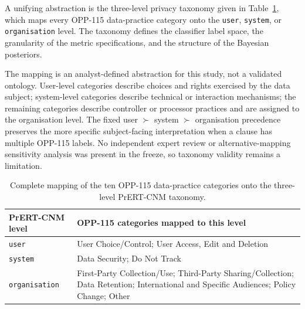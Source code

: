 \documentclass[final,3p,times,twocolumn]{elsarticle}
\begin{document}
	A unifying abstraction is the three-level privacy taxonomy given in Table~\ref{tab:labelspace},
	which maps every OPP-115 data-practice category onto the \texttt{user},
	\texttt{system}, or \texttt{organisation} level. The taxonomy defines the
	classifier label space, the granularity of the metric specifications, and the
	structure of the Bayesian posteriors.

	\begin{table}[!h]
		\centering
		\caption{Complete mapping of the ten OPP-115 data-practice categories onto
		the three-level PrERT-CNM taxonomy.}
		\label{tab:labelspace}
		The mapping is an analyst-defined abstraction for this study, not a
		validated ontology. User-level categories describe choices and rights
		exercised by the data subject; system-level categories describe
		technical or interaction mechanisms; the remaining categories describe
		controller or processor practices and are assigned to the organisation
		level. The fixed user $\succ$ system $\succ$ organisation precedence
		preserves the more specific subject-facing interpretation when a clause
		has multiple OPP-115 labels. No independent expert review or
		alternative-mapping sensitivity analysis was present in the freeze, so
		taxonomy validity remains a limitation.
        \footnotesize
		\begin{tabular}{@{}p{} p{}@{}}
			\toprule \textbf{PrERT-CNM level} & \textbf{OPP-115 categories mapped to this level}                                                                                       \\
			\midrule \texttt{user}            & User Choice/Control; User Access, Edit and Deletion                                                                                    \\
			\texttt{system}                   & Data Security; Do Not Track                                                                                                            \\
			\texttt{organisation}             & First-Party Collection/Use; Third-Party Sharing/Collection; Data Retention; International and Specific Audiences; Policy Change; Other \\
			\bottomrule
		\end{tabular}
	\end{table}
    
\end{document}

